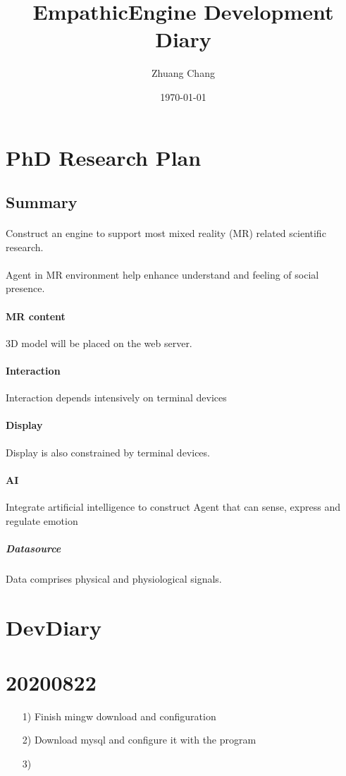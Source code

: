 \documentclass{article}
\begin{document}
\title{EmpathicEngine Development Diary}
\author{Zhuang Chang}
\date{\today}

\maketitle


\tableofcontents

\section{PhD Research Plan}
\subsection{Summary}
\paragraph{}
Construct an engine to support most mixed
reality (MR) related scientific research.
\paragraph{}
Agent in MR environment help enhance understand and 
feeling of social presence.
\paragraph{MR content}
3D model will be placed on the web server.
\paragraph{Interaction}
Interaction depends intensively on terminal devices
\paragraph{Display}
Display is also constrained by terminal devices.
\paragraph{AI}
Integrate artificial intelligence to construct Agent
that can sense, express and regulate emotion
\subparagraph{Datasource}
Data comprises physical and physiological signals.



\section{DevDiary}
\section{20200822}
\begin{enumerate}
    \item[1)] 
    Finish mingw download and configuration
    \item[2)] 
    Download mysql and configure it with the program
    \item[3)] 
     
\end{enumerate}
\end{document}
